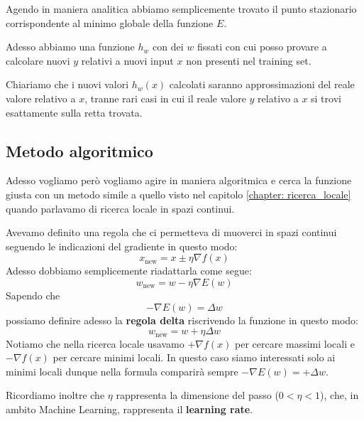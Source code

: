 Agendo in maniera analitica abbiamo semplicemente trovato il punto stazionario corrispondente al minimo globale della
funzione $E$.

Adesso abbiamo una funzione $h_w$ con dei $w$ fissati con cui posso provare a calcolare nuovi $y$ relativi a nuovi
input $x$ non presenti nel training set.

Chiariamo che i nuovi valori $h_w(x)$ calcolati saranno approssimazioni del reale valore relativo a $x$, tranne rari casi
in cui il reale valore $y$ relativo a $x$ si trovi esattamente sulla retta trovata.

\subsection{Metodo algoritmico}
Adesso vogliamo per\`o vogliamo agire in maniera algoritmica e cerca la funzione giusta con un metodo simile a quello
visto nel capitolo \ref{chapter: ricerca_locale} quando parlavamo di ricerca locale in spazi continui.

Avevamo definito una regola che ci permetteva di muoverci in spazi continui seguendo le indicazioni del gradiente in questo
modo:
\[ x_{\text{new}} = x \pm \eta \nabla f(x) \]
Adesso dobbiamo semplicemente riadattarla come segue:
\[ w_{\text{new}} = w - \eta \nabla E(w) \]
Sapendo che
\[ -\nabla E(w) = \Delta w \]
possiamo definire adesso la \textbf{regola delta} riscrivendo la funzione in questo modo:
\[ w_{\text{new}} = w + \eta \Delta w \]
Notiamo che nella ricerca locale usavamo $+\nabla f(x)$ per cercare massimi locali e $-\nabla f(x)$ per cercare minimi
locali. In questo caso siamo interessati solo ai minimi locali dunque nella formula comparir\`a sempre
$-\nabla E(w) = +\Delta w$.

Ricordiamo inoltre che $\eta$ rappresenta la dimensione del passo ($0 < \eta < 1$), che, in ambito Machine Learning,
rappresenta il \textbf{learning rate}.

